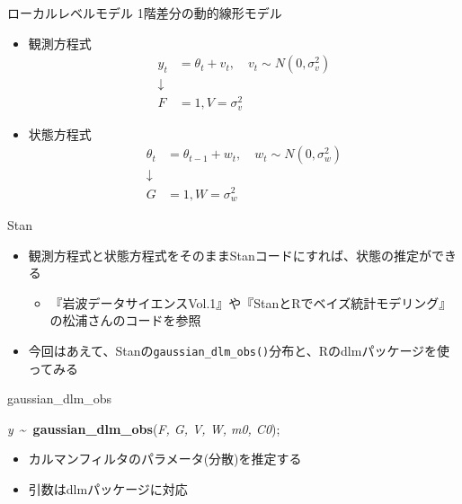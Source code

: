 \documentclass[dvipdfmx,12pt]{beamer}
\begin{document}
\begin{frame}{ローカルレベルモデル}
  1階差分の動的線形モデル

  \begin{itemize}
  \item 観測方程式
    \begin{align*}
      y_{t} &= \theta_{t} + v_{t}, \quad v_{t} \sim N(0, \sigma_{v}^2) \\
      \downarrow \\
      F &= 1, V = \sigma_{v}^2
    \end{align*}

  \item 状態方程式
    \begin{align*}
      \theta_{t} &= \theta_{t-1} + w_{t}, \quad w_{t} \sim N(0, \sigma_{w}^2) \\
      \downarrow \\
      G &= 1, W = \sigma_{w}^2
    \end{align*}
  \end{itemize}
\end{frame}

\begin{frame}{Stan}
  \begin{itemize}
  \item 観測方程式と状態方程式をそのまま\textsf{Stan}コードにすれば、状態の推定ができる
    \begin{itemize}
    \item 『岩波データサイエンスVol.1』や『StanとRでベイズ統計モデリング』の松浦さんのコードを参照
    \end{itemize}
  \item 今回はあえて、\textsf{Stan}の\texttt{gaussian\_dlm\_obs()}分布と、\textsf{R}の\textsf{dlm}パッケージを使ってみる
  \end{itemize}
\end{frame}

\begin{frame}{gaussian\_dlm\_obs}

  \textit{y}~\textasciitilde~\textbf{gaussian\_dlm\_obs}(\textit{F, G, V, W, m0, C0});

  \begin{itemize}
  \item カルマンフィルタのパラメータ(分散)を推定する
  \item 引数は\textsf{dlm}パッケージに対応
  \end{itemize}
\end{frame}
\end{document}

